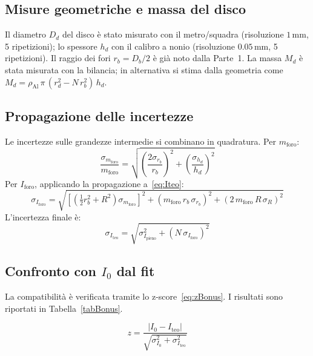 \documentclass{article}
\begin{document}
\subsection{Misure geometriche e massa del disco}
 
Il diametro $D_d$ del disco è stato misurato con il metro/squadra (risoluzione $1\,\text{mm}$, 5 ripetizioni); lo spessore $h_d$ con il calibro a nonio (risoluzione $0.05\,\text{mm}$, 5 ripetizioni). Il raggio dei fori $r_b = D_b/2$ è già noto dalla Parte~1. La massa $M_d$ è stata misurata con la bilancia; in alternativa si stima dalla geometria come $M_d = \rho_\text{Al}\,\pi\,(r_d^2 - N\,r_b^2)\,h_d$.
 
\subsection{Propagazione delle incertezze}
 
Le incertezze sulle grandezze intermedie si combinano in quadratura. Per $m_\text{foro}$:
\begin{equation}
    \frac{\sigma_{m_\text{foro}}}{m_\text{foro}} = \sqrt{\left(\frac{2\sigma_{r_b}}{r_b}\right)^2 + \left(\frac{\sigma_{h_d}}{h_d}\right)^2}
\end{equation}
Per $I_\text{foro}$, applicando la propagazione a~\eqref{eq:Iteo}:
\begin{equation}
    \sigma_{I_\text{foro}} = \sqrt{
        \left[\left(\tfrac{1}{2}r_b^2 + R^2\right)\sigma_{m_\text{foro}}\right]^2
        + \left(m_\text{foro}\,r_b\,\sigma_{r_b}\right)^2
        + \left(2\,m_\text{foro}\,R\,\sigma_R\right)^2
    }
\end{equation}
L'incertezza finale è:
\begin{equation}
    \sigma_{I_\text{teo}} = \sqrt{\sigma_{I_\text{pieno}}^2 + \left(N\,\sigma_{I_\text{foro}}\right)^2}
\end{equation}
 
\subsection{Confronto con $I_0$ dal fit}
 
La compatibilità è verificata tramite lo z-score~\eqref{eq:zBonus}. I risultati sono riportati in Tabella~\ref{tabBonus}.
 
\begin{equation}
    z = \frac{|I_0 - I_\text{teo}|}{\sqrt{\sigma_{I_0}^2 + \sigma_{I_\text{teo}}^2}}
    \label{eq:zBonus}
\end{equation}
 
\end{document}
